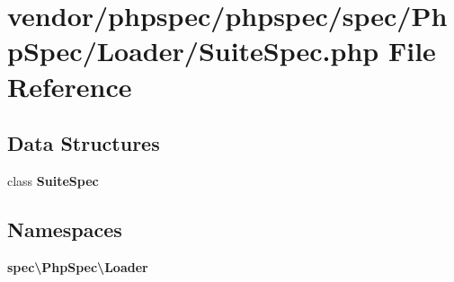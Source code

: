 \section{vendor/phpspec/phpspec/spec/\+Php\+Spec/\+Loader/\+Suite\+Spec.php File Reference}
\label{_suite_spec_8php}
\subsection*{Data Structures}
\begin{DoxyCompactItemize}
\item 
class {\bf Suite\+Spec}
\end{DoxyCompactItemize}
\subsection*{Namespaces}
\begin{DoxyCompactItemize}
\item 
 {\bf spec\textbackslash{}\+Php\+Spec\textbackslash{}\+Loader}
\end{DoxyCompactItemize}
